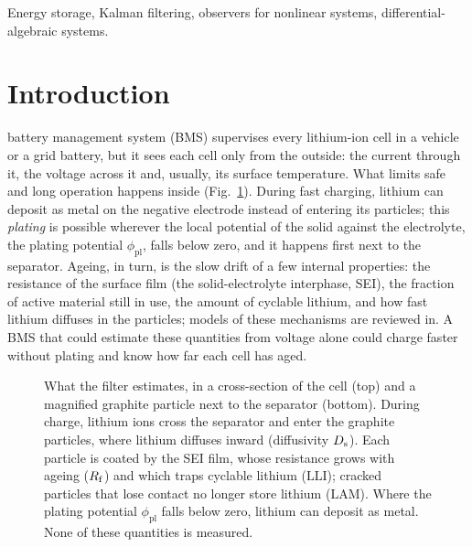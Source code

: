 \documentclass[journal]{IEEEtran}
\newcommand{\LAM}{\mathrm{LAM}}\newcommand{\LLI}{\mathrm{LLI}}\newcommand{\phipl}{\phi_{\mathrm{pl}}}
\begin{document}
\begin{IEEEkeywords}
Energy storage, Kalman filtering, observers for nonlinear systems, differential-algebraic systems.
\end{IEEEkeywords}

\section{Introduction}
 battery management system (BMS) supervises every lithium-ion cell in a vehicle or a grid battery, but it sees each cell only from the outside: the current through it, the voltage across it and, usually, its surface temperature. What limits safe and long operation happens inside (Fig.~\ref{fig:cell}). During fast charging, lithium can deposit as metal on the negative electrode instead of entering its particles; this \emph{plating} is possible wherever the local potential of the solid against the electrolyte, the plating potential $\phipl$, falls below zero\cite{arora1999,waldmann2018}, and it happens first next to the separator. Ageing, in turn, is the slow drift of a few internal properties: the resistance of the surface film (the solid-electrolyte interphase, SEI), the fraction of active material still in use, the amount of cyclable lithium, and how fast lithium diffuses in the particles\cite{birkl2017}; models of these mechanisms are reviewed in\cite{reniers2019,okane2022}. A BMS that could estimate these quantities from voltage alone could charge faster without plating and know how far each cell has aged.

\begin{figure}[t]
\centering

\caption{What the filter estimates, in a cross-section of the cell (top) and a magnified graphite particle next to the separator (bottom). During charge, lithium ions cross the separator and enter the graphite particles, where lithium diffuses inward (diffusivity $D_{\mathrm{s}}$). Each particle is coated by the SEI film, whose resistance grows with ageing ($R_{\mathrm{f}}$) and which traps cyclable lithium ($\LLI$); cracked particles that lose contact no longer store lithium ($\LAM$). Where the plating potential $\phipl$ falls below zero, lithium can deposit as metal. None of these quantities is measured.}
\label{fig:cell}
\end{figure}
\end{document}

